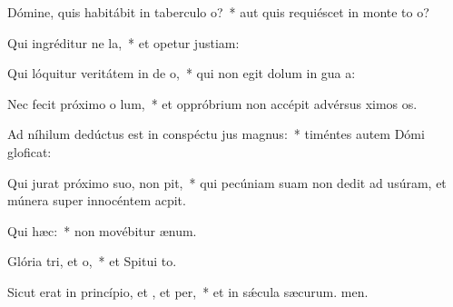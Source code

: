 \item Dómine, quis habitábit in taberculo o?~* aut quis requiéscet in monte to o?
\item Qui ingréditur ne la,~* et opetur justiam:
\item Qui lóquitur veritátem in de o,~* qui non egit dolum in gua a:
\item Nec fecit próximo o lum,~* et oppróbrium non accépit advérsus ximos os.
\item Ad níhilum dedúctus est in conspéctu jus magnus:~* timéntes autem Dómi gloficat:
\item Qui jurat próximo suo,  non pit,~* qui pecúniam suam non dedit ad usúram, et múnera super innocéntem  acpit.
\item Qui  hæc:~* non movébitur  ænum.
\item Glória tri, et o,~* et Spitui to.
\item Sicut erat in princípio, et , et per,~* et in sǽcula sæcurum. men.
